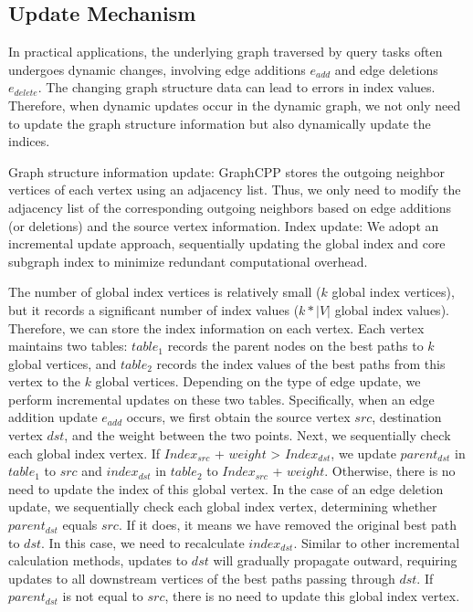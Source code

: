 \documentclass[lettersize,journal]{IEEEtran} %
\begin{document}
\subsection{Update Mechanism}
In practical applications, the underlying graph traversed by query tasks often undergoes dynamic changes, involving edge additions ${e_{add}}$ and edge deletions ${e_{delete}}$. The changing graph structure data can lead to errors in index values. Therefore, when dynamic updates occur in the dynamic graph, we not only need to update the graph structure information but also dynamically update the indices.

Graph structure information update: GraphCPP stores the outgoing neighbor vertices of each vertex using an adjacency list. Thus, we only need to modify the adjacency list of the corresponding outgoing neighbors based on edge additions (or deletions) and the source vertex information.
Index update: We adopt an incremental update approach, sequentially updating the global index and core subgraph index to minimize redundant computational overhead.

The number of global index vertices is relatively small ($k$ global index vertices), but it records a significant number of index values (${k*|V|}$ global index values). Therefore, we can store the index information on each vertex. Each vertex maintains two tables: $table_1$ records the parent nodes on the best paths to $k$ global vertices, and $table_2$ records the index values of the best paths from this vertex to the $k$ global vertices. Depending on the type of edge update, we perform incremental updates on these two tables. Specifically, when an edge addition update ${e_{add}}$ occurs, we first obtain the source vertex $src$, destination vertex ${dst}$, and the weight between the two points. Next, we sequentially check each global index vertex. If ${Index_{src}}$ + $weight$ > ${Index_{dst}}$, we update ${parent_{dst}}$ in $table_1$ to $src$ and ${index_{dst}}$ in $table_2$ to ${Index_{src}}$ + $weight$. Otherwise, there is no need to update the index of this global vertex. In the case of an edge deletion update, we sequentially check each global index vertex, determining whether ${parent_{dst}}$ equals $src$. If it does, it means we have removed the original best path to ${dst}$. In this case, we need to recalculate ${index_{dst}}$. Similar to other incremental calculation methods, updates to $dst$ will gradually propagate outward, requiring updates to all downstream vertices of the best paths passing through $dst$. If ${parent_{dst}}$ is not equal to $src$, there is no need to update this global index vertex.
\end{document}
